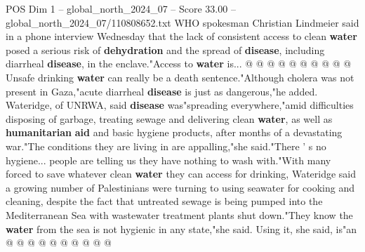 \begin{textsample}{POS Dim 1 – global\_north\_2024\_07 – Score 33.00 – global\_north\_2024\_07/110808652.txt}
WHO spokesman Christian Lindmeier said in a phone interview Wednesday that the lack of consistent access to clean \textbf{water} posed a serious risk of \textbf{dehydration} and the spread of \textbf{disease}, including diarrheal \textbf{disease}, in the enclave."Access to \textbf{water} is... @ @ @ @ @ @ @ @ @ @ Unsafe drinking \textbf{water} can really be a death sentence."Although cholera was not present in Gaza,"acute diarrheal \textbf{disease} is just as dangerous,"he added.
Wateridge, of UNRWA, said \textbf{disease} was"spreading everywhere,"amid difficulties disposing of garbage, treating sewage and delivering clean \textbf{water}, as well as \textbf{humanitarian} \textbf{aid} and basic hygiene products, after months of a devastating war."The conditions they are living in are appalling,"she said."There ' s no hygiene... people are telling us they have nothing to wash with."With many forced to save whatever clean \textbf{water} they can access for drinking, Wateridge said a growing number of Palestinians were turning to using seawater for cooking and cleaning, despite the fact that untreated sewage is being pumped into the Mediterranean Sea with wastewater treatment plants shut down."They know the \textbf{water} from the sea is not hygienic in any state,"she said.
Using it, she said, is"an @ @ @ @ @ @ @ @ @ @

\end{textsample}
